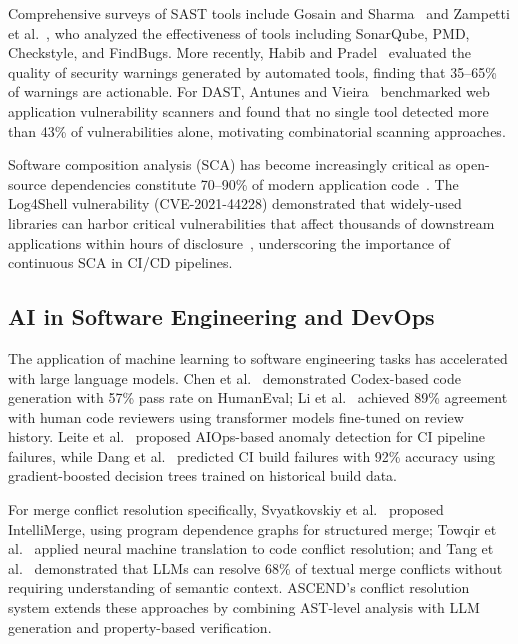 \documentclass[journal]{IEEEtran}
\begin{document}
Comprehensive surveys of SAST tools include Gosain and Sharma~\cite{gosain2015} and Zampetti et al.~\cite{zampetti2017}, who analyzed the effectiveness of tools including SonarQube, PMD, Checkstyle, and FindBugs. More recently, Habib and Pradel~\cite{habib2018} evaluated the quality of security warnings generated by automated tools, finding that 35--65\% of warnings are actionable. For DAST, Antunes and Vieira~\cite{antunes2010} benchmarked web application vulnerability scanners and found that no single tool detected more than 43\% of vulnerabilities alone, motivating combinatorial scanning approaches.

Software composition analysis (SCA) has become increasingly critical as open-source dependencies constitute 70--90\% of modern application code~\cite{synopsys2025}. The Log4Shell vulnerability (CVE-2021-44228) demonstrated that widely-used libraries can harbor critical vulnerabilities that affect thousands of downstream applications within hours of disclosure~\cite{chen2022log4shell}, underscoring the importance of continuous SCA in CI/CD pipelines.

\subsection{AI in Software Engineering and DevOps}

The application of machine learning to software engineering tasks has accelerated with large language models. Chen et al.~\cite{chen2021codex} demonstrated Codex-based code generation with 57\% pass rate on HumanEval; Li et al.~\cite{li2023} achieved 89\% agreement with human code reviewers using transformer models fine-tuned on review history. Leite et al.~\cite{leite2020} proposed AIOps-based anomaly detection for CI pipeline failures, while Dang et al.~\cite{dang2019} predicted CI build failures with 92\% accuracy using gradient-boosted decision trees trained on historical build data.

For merge conflict resolution specifically, Svyatkovskiy et al.~\cite{svyatkovskiy2022} proposed IntelliMerge, using program dependence graphs for structured merge; Towqir et al.~\cite{towqir2022} applied neural machine translation to code conflict resolution; and Tang et al.~\cite{tang2023} demonstrated that LLMs can resolve 68\% of textual merge conflicts without requiring understanding of semantic context. ASCEND's conflict resolution system extends these approaches by combining AST-level analysis with LLM generation and property-based verification.
\end{document}
